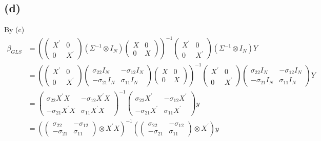 \documentclass{article}
\begin{document}
\subsection{(d)}
By (c)
\begin{align*}
	\beta_{GLS} &= \left(\left(\begin{array}{cc} X^{'} & 0 \\ 0 & X^{'} \end{array}\right) \left(\Sigma^{-1} \otimes I_N \right) \left(\begin{array}{cc} X & 0 \\ 0 & X \end{array}\right)\right)^{-1} \left(\begin{array}{cc} X^{'} & 0 \\ 0 & X^{'} \end{array}\right) \left(\Sigma^{-1} \otimes I_N \right) Y\\[8pt]
	&= \left(\left(\begin{array}{cc} X^{'} & 0 \\ 0 & X^{'} \end{array}\right) \left(\begin{array}{cc} \sigma_{22}I_N & -\sigma_{12}I_N \\ -\sigma_{21} I_N & \sigma_{11} I_N \end{array}\right) \left(\begin{array}{cc} X & 0 \\ 0 & X \end{array}\right)\right)^{-1} \left(\begin{array}{cc} X^{'} & 0 \\ 0 & X^{'} \end{array}\right) \left(\begin{array}{cc} \sigma_{22}I_N & -\sigma_{12}I_N \\ -\sigma_{21} I_N & \sigma_{11} I_N \end{array}\right) Y\\[8pt]
	&= \left( \begin{array}{cc} \sigma_{22}X^{'}X & -\sigma_{12} X^{'}X \\ -\sigma_{21}X^{'}X & \sigma_{11}X^{'}X \end{array} \right)^{-1} \left( \begin{array}{cc} \sigma_{22}X^{'} & -\sigma_{12} X^{'} \\ -\sigma_{21}X^{'} & \sigma_{11}X^{'} \end{array} \right) y\\[8pt]
	&= \left(\left( \begin{array}{cc} \sigma_{22} & -\sigma_{12} \\ -\sigma_{21} & \sigma_{11} \end{array} \right) \otimes X^{'}X\right)^{-1} \left(\left( \begin{array}{cc} \sigma_{22} & -\sigma_{12} \\ -\sigma_{21} & \sigma_{11} \end{array} \right) \otimes X^{'} \right) y\\[8pt]

\end{align*}
\end{document}
